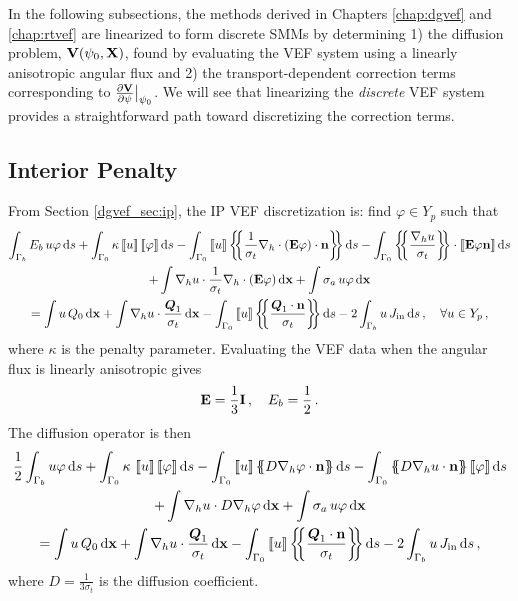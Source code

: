 \documentclass[../doc.tex]{subfiles}
\begin{document}
In the following subsections, the methods derived in Chapters \ref{chap:dgvef} and \ref{chap:rtvef} are linearized to form discrete SMMs by determining 1) the diffusion problem, $\boldsymbol{\mathrm{V}}(\psi_0, \boldsymbol{\mathrm{X}})$, found by evaluating the VEF system using a linearly anisotropic angular flux and 2) the transport-dependent correction terms corresponding to $\frac{\partial \boldsymbol{\mathrm{V}}}{\partial \psi}\big\rvert_{\psi_0}$. We will see that linearizing the \emph{discrete} VEF system provides a straightforward path toward discretizing the correction terms. 

\subsection{Interior Penalty}
From Section \ref{dgvef_sec:ip}, the IP VEF discretization is: find $\varphi\in Y_p$ such that 
	\begin{multline} \label{smm:ipvef}
		\int_{\Gamma_b} E_b\, u \varphi \ud s + \int_{\Gamma_0} \kappa \jump{u} \jump{\varphi} \ud s - \int_{\Gamma_0} \jump{u} \avg{\frac{1}{\sigma_t}\nablah\cdot\paren{\E\varphi}\cdot\n} \ud s - \int_{\Gamma_0} \avg{\frac{\nablah u}{\sigma_t}} \cdot \jump{\E\varphi\n} \ud s \\
		+ \int \nablah u \cdot \frac{1}{\sigma_t}\nablah\cdot\paren{\E\varphi} \ud \x + \int \sigma_a\, u \varphi \ud \x \\ 
		= \int u\, Q_0 \ud \x + \int \nablah u \cdot \frac{\vec{Q}_1}{\sigma_t} \ud \x - \int_{\Gamma_0} \jump{u} \avg{\frac{\vec{Q}_1\cdot\n}{\sigma_t}} \ud s - 2\int_{\Gamma_b} u\, \Jin \ud s \,, \quad \forall u \in Y_p \,, 
	\end{multline}
where $\kappa$ is the penalty parameter. Evaluating the VEF data when the angular flux is linearly anisotropic gives
	\begin{equation}
		\boldsymbol{\mathrm{E}} = \frac{1}{3}\boldsymbol{\mathrm{I}} \,, \quad E_b = \frac{1}{2} \,. 
	\end{equation}
The diffusion operator is then 
	\begin{multline}
		\frac{1}{2}\int_{\Gamma_b} u\varphi \ud s + \int_{\Gamma_0} \kappa\, \jump{u}\jump{\varphi} \ud s - \int_{\Gamma_0} \jump{u}\avg{D\nablah\varphi\cdot\n} \ud s - \int_{\Gamma_0} \avg{D\nablah u\cdot\n} \jump{\varphi} \ud s \\
		+ \int \nablah u \cdot D\nablah\varphi \ud \x + \int \sigma_a\, u \varphi \ud \x \\
		= \int u\, Q_0 \ud \x + \int \nablah u \cdot \frac{\vec{Q}_1}{\sigma_t} \ud \x - \int_{\Gamma_0} \jump{u} \avg{\frac{\vec{Q}_1\cdot\n}{\sigma_t}} \ud s - 2\int_{\Gamma_b} u\, \Jin \ud s \,,
	\end{multline}
where $D = \frac{1}{3\sigma_t}$ is the diffusion coefficient. 
\end{document}
